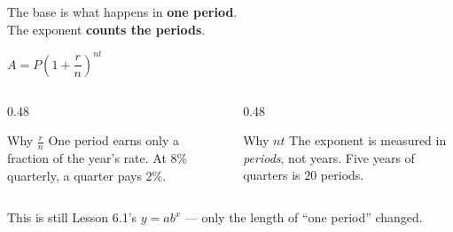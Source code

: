 \documentclass[aspectratio=169, 11pt]{beamer}
\begin{document}
\begin{frame}[t, plain]
  \begin{center}
    \Large The base is what happens in \textbf{one period}. \\[4pt]
    The exponent \textbf{counts the periods}.
  \end{center}
  \vspace{8pt}
  \begin{center}
    \Large $A = P\left(1+\dfrac{r}{n}\right)^{nt}$
  \end{center}
  \vspace{6pt}
  \begin{columns}[T]
    \begin{column}{0.48\textwidth}
      \begin{block}{Why $\frac{r}{n}$}
        \footnotesize One period earns only a fraction of the year's rate. At $8\%$ quarterly, a
        quarter pays $2\%$.
      \end{block}
    \end{column}
    \begin{column}{0.48\textwidth}
      \begin{block}{Why $nt$}
        \footnotesize The exponent is measured in \emph{periods}, not years. Five years of quarters is
        $20$ periods.
      \end{block}
    \end{column}
  \end{columns}
  \vspace{5pt}
  \begin{center}{\footnotesize This is still Lesson 6.1's $y=ab^{x}$ --- only the length of ``one
  period'' changed.}\end{center}
\end{frame}
\end{document}
